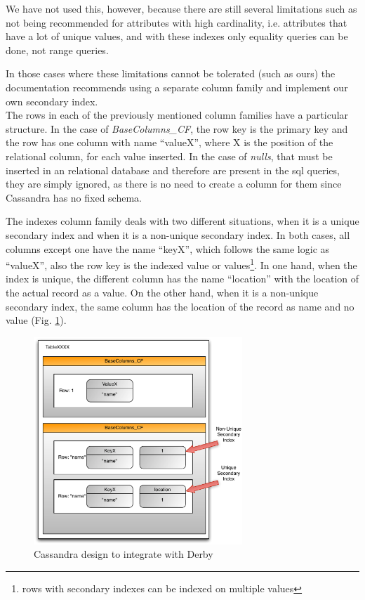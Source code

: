 We have not used this, however, because there are still several limitations such as not being recommended for attributes with high cardinality, i.e. attributes that have a lot of unique values, and with these indexes only equality queries can be done, not range queries\cite{secindexlimitations}.

In those cases where these limitations cannot be tolerated (such as ours) the documentation recommends using a separate column family and implement our own secondary index\cite{secindex}. \\ 

The rows in each of the previously mentioned column families have a particular structure. In the case of \emph{BaseColumns\_CF}, the row key is the primary key and the row has one column with name ``valueX'', where X is the position of the relational column, for each value inserted. In the case of \emph{nulls}, that must be inserted in an relational database and therefore are present in the \ac{sql} queries, they are simply ignored, as there is no need to create a column for them since Cassandra has no fixed schema.  

The indexes column family deals with two different situations, when it is a unique secondary index and when it is a non-unique secondary index. In both cases, all columns except one have the name ``keyX'', which follows the same logic as ``valueX'', also the row key is the indexed value or values\footnote{rows with secondary indexes can be indexed on multiple values}. In one hand, when the index is unique, the different column has the name ``location'' with the location of the actual record as a value. On the other hand, when it is a non-unique secondary index, the same column has the location of the record as name and no value (Fig. \ref{fig:mymodel}).

\begin{figure}[htb]
  \begin{center}
    \leavevmode
    \includegraphics[width=0.7\textwidth]{images/mymodel}
  \end{center}
  \caption{Cassandra design to integrate with Derby}
  \label{fig:mymodel}
\end{figure}

